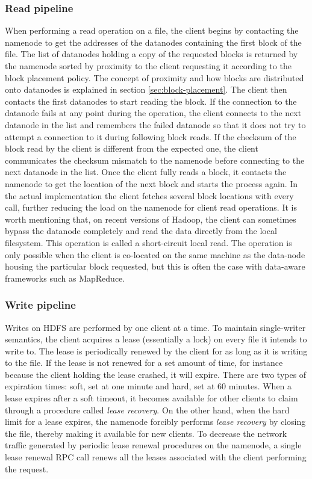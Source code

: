 \subsubsection{Read pipeline}
When performing a read operation on a file, the client begins by contacting the namenode to get the addresses of the datanodes containing the first block of the file.
The list of datanodes holding a copy of the requested blocks is returned by the namenode sorted by proximity to the client requesting it according to the block placement policy.
The concept of proximity and how blocks are distributed onto datanodes is explained in section \ref{sec:block-placement}.
The client then contacts the first datanodes to start reading the block.
If the connection to the datanode fails at any point during the operation, the client connects to the next datanode in the list and remembers the failed datanode so that it does not try to attempt a connection to it during following block reads.
If the checksum of the block read by the client is different from the expected one, the client communicates the checksum mismatch to the namenode before connecting to the next datanode in the list.
Once the client fully reads a block, it contacts the namenode to get the location of the next block and starts the process again.
In the actual implementation the client fetches several block locations with every call, further reducing the load on the namenode for client read operations.
It is worth mentioning that, on recent versions of Hadoop, the client can sometimes bypass the datanode completely and read the data directly from the local filesystem.
This operation is called a short-circuit local read.
The operation is only possible when the client is co-located on the same machine as the data-node housing the particular block requested, but this is often the case with data-aware frameworks such as MapReduce.

\subsubsection{Write pipeline}
\label{sec:write-pipeline}
Writes on HDFS are performed by one client at a time.
To maintain single-writer semantics, the client acquires a lease (essentially a lock) on every file it intends to write to.
The lease is periodically renewed by the client for as long as it is writing to the file.
If the lease is not renewed for a set amount of time, for instance because the client holding the lease crashed, it will expire.
There are two types of expiration times: soft, set at one minute and hard, set at 60 minutes.
When a lease expires after a soft timeout, it becomes available for other clients to claim through a procedure called \textit{lease recovery}.
On the other hand, when the hard limit for a lease expires, the namenode forcibly performs \textit{lease recovery} by closing the file, thereby making it available for new clients.
To decrease the network traffic generated by periodic lease renewal procedures on the namenode, a single lease renewal RPC call renews all the leases associated with the client performing the request.

